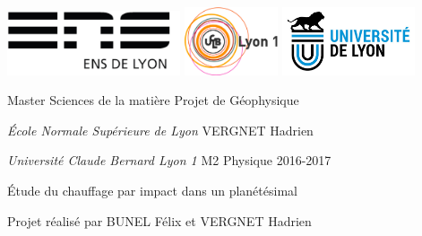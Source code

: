 \documentclass[10pt,a4paper]{article}
\author{Vergnet Hadrien}
\numberwithin{equation}{section}
\begin{document}
\begin{titlepage}
\thispagestyle{empty}
\setlength{\parindent}{0pt}

\includegraphics[height=1.9cm]{logo-ens.jpg} \hfill \includegraphics[height=2cm]{logo_lyon1.jpg} \hfill \includegraphics[height=2cm]{logo_univ_lyon.jpg}



Master Sciences de la matière
\hfill
Projet de Géophysique

\textit{École Normale Supérieure de Lyon}
\hfill
VERGNET Hadrien

\textit{Université Claude Bernard Lyon 1}
\hfill
M2 Physique 2016-2017

\vspace{0.5cm}

\hrulefill
\vspace{-0.6cm}

\hrulefill
\begin{center}\bfseries
\begin{huge}
Étude du chauffage par impact dans un planétésimal
\end{huge}
\Large
\vspace{0.4cm}

Projet réalisé par BUNEL Félix et VERGNET Hadrien
\end{center}
\hrulefill
\vspace{-0.6cm}

\hrulefill


\end{titlepage}
\end{document}

